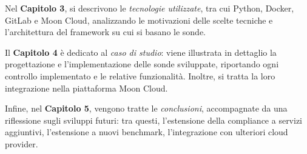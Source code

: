 Nel \textbf{Capitolo 3}, si descrivono le \textit{tecnologie utilizzate}, tra cui Python, Docker, GitLab e Moon Cloud, analizzando le motivazioni delle scelte tecniche e l'architettura del framework su cui si basano le sonde.

Il \textbf{Capitolo 4} è dedicato al \textit{caso di studio}: viene illustrata in dettaglio la progettazione e l'implementazione delle sonde sviluppate, riportando ogni controllo implementato e le relative funzionalità. Inoltre, si tratta la loro integrazione nella piattaforma Moon Cloud.

Infine, nel \textbf{Capitolo 5}, vengono tratte le \textit{conclusioni}, accompagnate da una riflessione sugli sviluppi futuri: tra questi, l'estensione della compliance a servizi aggiuntivi, l'estensione a nuovi benchmark, l'integrazione con ulteriori cloud provider.

